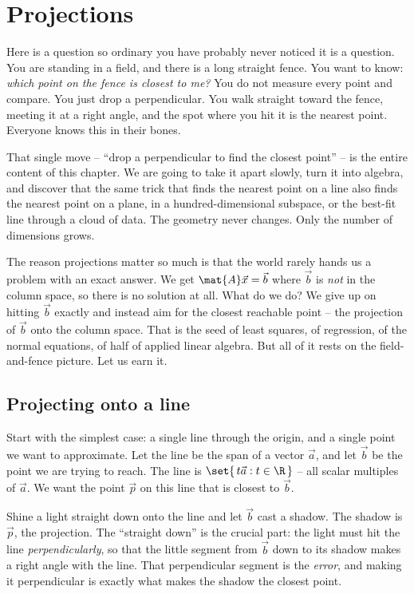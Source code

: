 \chapter{Projections}

Here is a question so ordinary you have probably never noticed it is a question. You are standing
in a field, and there is a long straight fence. You want to know: \emph{which point on the fence is
closest to me?} You do not measure every point and compare. You just drop a perpendicular. You walk
straight toward the fence, meeting it at a right angle, and the spot where you hit it is the
nearest point. Everyone knows this in their bones.

That single move -- ``drop a perpendicular to find the closest point'' -- is the entire content of
this chapter. We are going to take it apart slowly, turn it into algebra, and discover that the
same trick that finds the nearest point on a line also finds the nearest point on a plane, in a
hundred-dimensional subspace, or the best-fit line through a cloud of data. The geometry never
changes. Only the number of dimensions grows.

The reason projections matter so much is that the world rarely hands us a problem with an exact
answer. We get $\mat{A}\vec{x}=\vec{b}$ where $\vec{b}$ is \emph{not} in the column space, so there
is no solution at all. What do we do? We give up on hitting $\vec{b}$ exactly and instead aim for
the closest reachable point -- the projection of $\vec{b}$ onto the column space. That is the seed
of least squares, of regression, of the normal equations, of half of applied linear algebra. But
all of it rests on the field-and-fence picture. Let us earn it.

\section{Projecting onto a line}

Start with the simplest case: a single line through the origin, and a single point we want to
approximate. Let the line be the span of a vector $\vec{a}$, and let $\vec{b}$ be the point we are
trying to reach. The line is $\set{\,t\vec{a} : t \in \R\,}$ -- all scalar multiples of $\vec{a}$.
We want the point $\vec{p}$ on this line that is closest to $\vec{b}$.

\begin{intuitionbox}
Shine a light straight down onto the line and let $\vec{b}$ cast a shadow. The shadow is $\vec{p}$,
the projection. The ``straight down'' is the crucial part: the light must hit the line
\emph{perpendicularly}, so that the little segment from $\vec{b}$ down to its shadow makes a right
angle with the line. That perpendicular segment is the \emph{error}, and making it perpendicular is
exactly what makes the shadow the closest point.
\end{intuitionbox}

